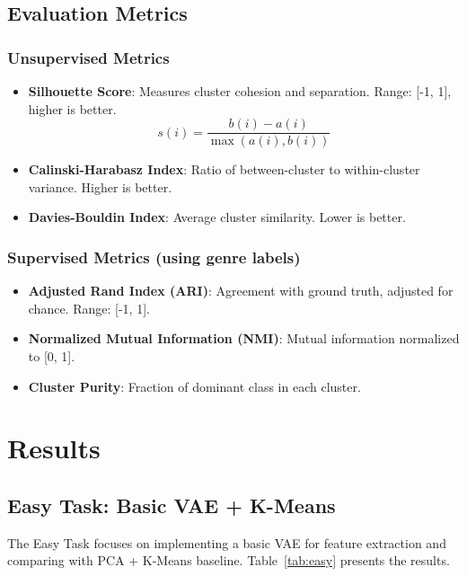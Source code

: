 \documentclass{article}
\begin{document}
\subsection{Evaluation Metrics}

\subsubsection{Unsupervised Metrics}
\begin{itemize}
    \item \textbf{Silhouette Score}: Measures cluster cohesion and separation. Range: [-1, 1], higher is better.
    \begin{equation}
    s(i) = \frac{b(i) - a(i)}{\max(a(i), b(i))}
    \end{equation}
    
    \item \textbf{Calinski-Harabasz Index}: Ratio of between-cluster to within-cluster variance. Higher is better.
    
    \item \textbf{Davies-Bouldin Index}: Average cluster similarity. Lower is better.
\end{itemize}

\subsubsection{Supervised Metrics (using genre labels)}
\begin{itemize}
    \item \textbf{Adjusted Rand Index (ARI)}: Agreement with ground truth, adjusted for chance. Range: [-1, 1].
    \item \textbf{Normalized Mutual Information (NMI)}: Mutual information normalized to [0, 1].
    \item \textbf{Cluster Purity}: Fraction of dominant class in each cluster.
\end{itemize}

\section{Results}

\subsection{Easy Task: Basic VAE + K-Means}

The Easy Task focuses on implementing a basic VAE for feature extraction and comparing with PCA + K-Means baseline. Table~\ref{tab:easy} presents the results.
\end{document}
